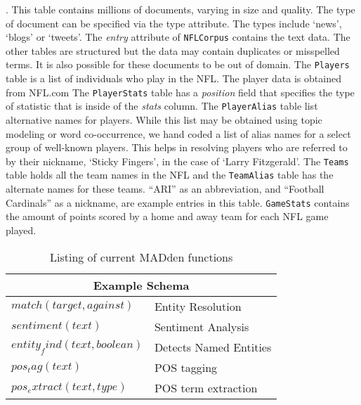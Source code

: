 . This table contains
millions of documents, varying in size and quality. The type of document 
can be specified via the type attribute. The types include `news', `blogs' or
`tweets'. The \textit{entry} attribute of {\tt NFLCorpus} contains the text data.
The other tables are structured but the data may contain duplicates or
misspelled terms. It is also possible for these documents to be out of domain.
The {\tt Players} table is a list of individuals
who play in the NFL. The player data is obtained from NFL.com
The {\tt PlayerStats} table has a \textit{position} field that specifies
the type of statistic that is inside of the \textit{stats} column.
The {\tt PlayerAlias} table list alternative names for players.
While this list may be obtained using topic modeling or word
co-occurrence, we hand coded a list of alias names for a select
group of well-known players. This helps in resolving players who are
referred to by their nickname, `Sticky Fingers', in the case of
`Larry Fitzgerald'.
The {\tt Teams} table holds all the team
names in the NFL and the {\tt TeamAlias} table has the alternate names for these
teams. ``ARI'' as an abbreviation,  and ``Football Cardinals'' as a nickname, are 
example entries in this table. {\tt GameStats} contains the amount of points scored by a 
home and away team for each NFL game played.\\


\begin{table}
\begin{center}
\begin{tabular}{|l|l|}
\hline
\multicolumn{2}{|c|}{Example Schema}\\
\hline
$match(target, against)$ & Entity Resolution\\
\hline
$sentiment(text)$ & Sentiment Analysis\\
\hline
$entity_find(text, boolean)$ & Detects Named Entities\\
\hline
$pos_tag(text)$ & POS tagging\\
\hline
$pos_extract(text, type)$ & POS term extraction \\
\hline
\end{tabular}
\end{center}
\caption{Listing of current MADden functions}
\label{tab:madschema}
\end{table}

